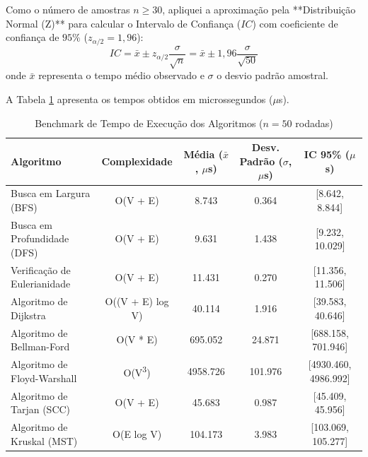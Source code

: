 \documentclass[sigconf]{webmedia}
\begin{document}
Como o número de amostras $n \ge 30$, apliquei a aproximação pela **Distribuição Normal (Z)** para calcular o Intervalo de Confiança ($IC$) com coeficiente de confiança de $95\%$ ($z_{\alpha/2} = 1,96$):
\begin{equation}
    IC = \bar{x} \pm z_{\alpha/2} \frac{\sigma}{\sqrt{n}} = \bar{x} \pm 1,96 \frac{\sigma}{\sqrt{50}}
\end{equation}
onde $\bar{x}$ representa o tempo médio observado e $\sigma$ o desvio padrão amostral.

A Tabela \ref{tab:benchmark} apresenta os tempos obtidos em microssegundos ($\mu$s).

\begin{table}[t]
  \centering
  \caption{Benchmark de Tempo de Execução dos Algoritmos ($n = 50$ rodadas)}
  \label{tab:benchmark}
  \setlength{\tabcolsep}{4pt} 
  \small 
  \begin{tabular}{lcccc}
    \toprule
    Algoritmo & Complexidade & Média ($\bar{x}$, $\mu$s) & Desv. Padrão ($\sigma$, $\mu$s) & IC 95\% ($\mu$s) \\
    \midrule
    Busca em Largura (BFS) & O(V + E) & 8.743 & 0.364 & [8.642, 8.844] \\
    Busca em Profundidade (DFS) & O(V + E) & 9.631 & 1.438 & [9.232, 10.029] \\
    Verificação de Eulerianidade & O(V + E) & 11.431 & 0.270 & [11.356, 11.506] \\
    Algoritmo de Dijkstra & O((V + E) log V) & 40.114 & 1.916 & [39.583, 40.646] \\
    Algoritmo de Bellman-Ford & O(V * E) & 695.052 & 24.871 & [688.158, 701.946] \\
    Algoritmo de Floyd-Warshall & O(V\textsuperscript{3}) & 4958.726 & 101.976 & [4930.460, 4986.992] \\
    Algoritmo de Tarjan (SCC) & O(V + E) & 45.683 & 0.987 & [45.409, 45.956] \\
    Algoritmo de Kruskal (MST) & O(E log V) & 104.173 & 3.983 & [103.069, 105.277] \\
    \bottomrule
  \end{tabular}
\end{table}
\end{document}
